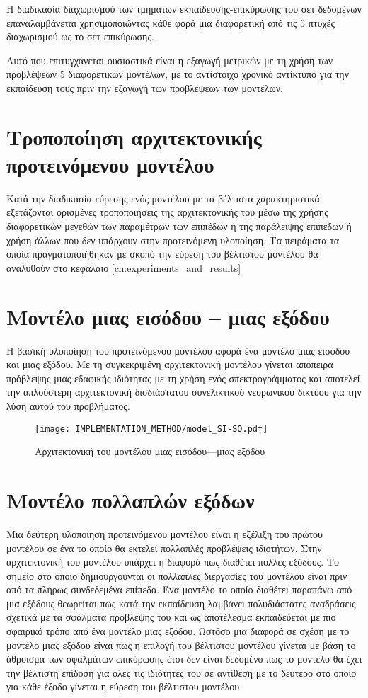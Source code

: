 Η διαδικασία διαχωρισμού των τμημάτων εκπαίδευσης-επικύρωσης του σετ δεδομένων επαναλαμβάνεται χρησιμοποιώντας κάθε φορά μια διαφορετική από τις 5 πτυχές διαχωρισμού ως το σετ επικύρωσης.

Αυτό που επιτυγχάνεται ουσιαστικά είναι η εξαγωγή μετρικών με τη χρήση των προβλέψεων 5 διαφορετικών μοντέλων, με το αντίστοιχο χρονικό αντίκτυπο για την εκπαίδευση τους πριν την εξαγωγή των προβλέψεων των μοντέλων.

\section{Τροποποίηση αρχιτεκτονικής προτεινόμενου μοντέλου}
Κατά την διαδικασία εύρεσης ενός μοντέλου με τα βέλτιστα χαρακτηριστικά εξετάζονται ορισμένες τροποποιήσεις της αρχιτεκτονικής του μέσω της χρήσης διαφορετικών μεγεθών των παραμέτρων των επιπέδων ή της παράλειψης επιπέδων ή χρήση άλλων που δεν υπάρχουν στην προτεινόμενη υλοποίηση. Τα πειράματα τα οποία πραγματοποιήθηκαν με σκοπό την εύρεση του βέλτιστου μοντέλου θα αναλυθούν στο κεφάλαιο \ref{ch:experiments_and_results}

\section{Μοντέλο μιας εισόδου -- μιας εξόδου}
Η βασική υλοποίηση του προτεινόμενου μοντέλου αφορά ένα μοντέλο μιας εισόδου και μιας εξόδου. Με τη συγκεκριμένη αρχιτεκτονική μοντέλου γίνεται απόπειρα πρόβλεψης μιας εδαφικής ιδιότητας με τη χρήση ενός σπεκτρογράμματος και αποτελεί την απλούστερη αρχιτεκτονική δισδιάστατου συνελικτικού νευρωνικού δικτύου για την λύση αυτού του προβλήματος.
\begin{figure}[H]
  \begin{center}
    \texttt{[image: IMPLEMENTATION\_METHOD/model\_SI-SO.pdf]}
    \caption{Αρχιτεκτονική του μοντέλου μιας εισόδου---μιας εξόδου}
  \end{center}
\end{figure}
\section{Μοντέλο πολλαπλών εξόδων}
Μια δεύτερη υλοποίηση προτεινόμενου μοντέλου είναι η εξέλιξη του πρώτου μοντέλου σε ένα το οποίο θα εκτελεί πολλαπλές προβλέψεις ιδιοτήτων. Στην αρχιτεκτονική του μοντέλου υπάρχει η διαφορά πως διαθέτει πολλές εξόδους. Το σημείο στο οποίο δημιουργούνται οι πολλαπλές διεργασίες του μοντέλου είναι πριν από τα πλήρως συνδεδεμένα επίπεδα. Ένα μοντέλο το οποίο διαθέτει παραπάνω από μια εξόδους θεωρείται πως κατά την εκπαίδευση λαμβάνει πολυδιάστατες αναδράσεις σχετικά με τα σφάλματα πρόβλεψης του και ως αποτέλεσμα εκπαιδεύεται με πιο σφαιρικό τρόπο από ένα μοντέλο μιας εξόδου. Ωστόσο μια διαφορά σε σχέση με το μοντέλο μιας εξόδου είναι πως η επιλογή του βέλτιστου μοντέλου γίνεται με βάση το άθροισμα των σφαλμάτων επικύρωσης έτσι δεν είναι δεδομένο πως το μοντέλο θα έχει την βέλτιστη επίδοση για όλες τις ιδιότητες του σε αντίθεση με το δεύτερο στο οποίο για κάθε έξοδο γίνεται η εύρεση του βέλτιστου μοντέλου.

